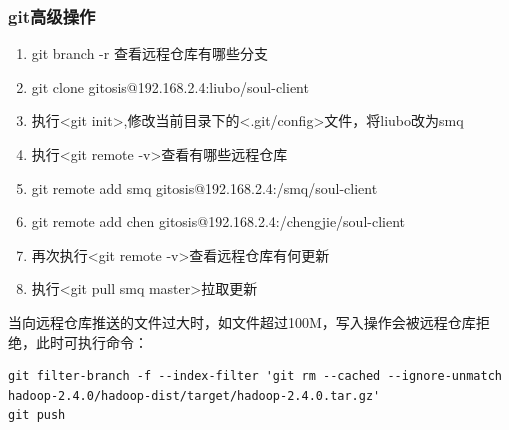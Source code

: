 \subsubsection{git高级操作}
\begin{enumerate}[(1)]
\item git branch -r 查看远程仓库有哪些分支
\item git clone gitosis@192.168.2.4:liubo/soul-client
\item 执行<git init>,修改当前目录下的<.git/config>文件，将liubo改为smq
\item 执行<git remote -v>查看有哪些远程仓库
\item git remote add smq gitosis@192.168.2.4:/smq/soul-client
\item git remote add chen gitosis@192.168.2.4:/chengjie/soul-client
\item 再次执行<git remote -v>查看远程仓库有何更新
\item 执行<git pull smq master>拉取更新
\end{enumerate}
\par 当向远程仓库推送的文件过大时，如文件超过100M，写入操作会被远程仓库拒绝，此时可执行命令：
\begin{verbatim}
git filter-branch -f --index-filter 'git rm --cached --ignore-unmatch hadoop-2.4.0/hadoop-dist/target/hadoop-2.4.0.tar.gz'
git push
\end{verbatim}
